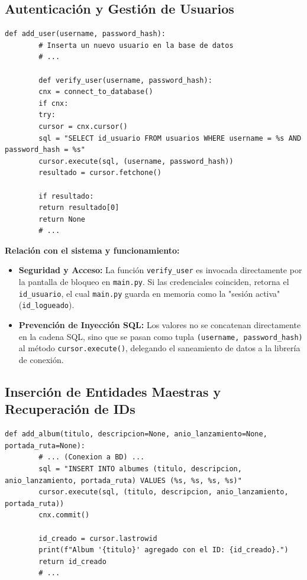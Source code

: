 \documentclass[11pt]{article}
\begin{document}
	\subsection{Autenticación y Gestión de Usuarios}
	\begin{lstlisting}[style=pythonstyle]
		def add_user(username, password_hash):
		# Inserta un nuevo usuario en la base de datos
		# ...
		
		def verify_user(username, password_hash):
		cnx = connect_to_database()
		if cnx:
		try:
		cursor = cnx.cursor()
		sql = "SELECT id_usuario FROM usuarios WHERE username = %s AND password_hash = %s"
		cursor.execute(sql, (username, password_hash))
		resultado = cursor.fetchone()
		
		if resultado:
		return resultado[0]
		return None
		# ...
	\end{lstlisting}
	
	\noindent\textbf{Relación con el sistema y funcionamiento:}
	\begin{itemize}[noitemsep,topsep=2pt]
		\item \textbf{Seguridad y Acceso:} La función \texttt{verify\_user} es invocada directamente por la pantalla de bloqueo en \texttt{main.py}. Si las credenciales coinciden, retorna el \texttt{id\_usuario}, el cual \texttt{main.py} guarda en memoria como la "sesión activa" (\texttt{id\_logueado}).
		\item \textbf{Prevención de Inyección SQL:} Los valores no se concatenan directamente en la cadena SQL, sino que se pasan como tupla \texttt{(username, password\_hash)} al método \texttt{cursor.execute()}, delegando el saneamiento de datos a la librería de conexión.
	\end{itemize}
	
	\vspace{0.5cm}
	
	\subsection{Inserción de Entidades Maestras y Recuperación de IDs}
	\begin{lstlisting}[style=pythonstyle]
		def add_album(titulo, descripcion=None, anio_lanzamiento=None, portada_ruta=None):
		# ... (Conexion a BD) ...
		sql = "INSERT INTO albumes (titulo, descripcion, anio_lanzamiento, portada_ruta) VALUES (%s, %s, %s, %s)"
		cursor.execute(sql, (titulo, descripcion, anio_lanzamiento, portada_ruta))
		cnx.commit()
		
		id_creado = cursor.lastrowid 
		print(f"Album '{titulo}' agregado con el ID: {id_creado}.")
		return id_creado
		# ...
	\end{lstlisting}
	
\end{document}
